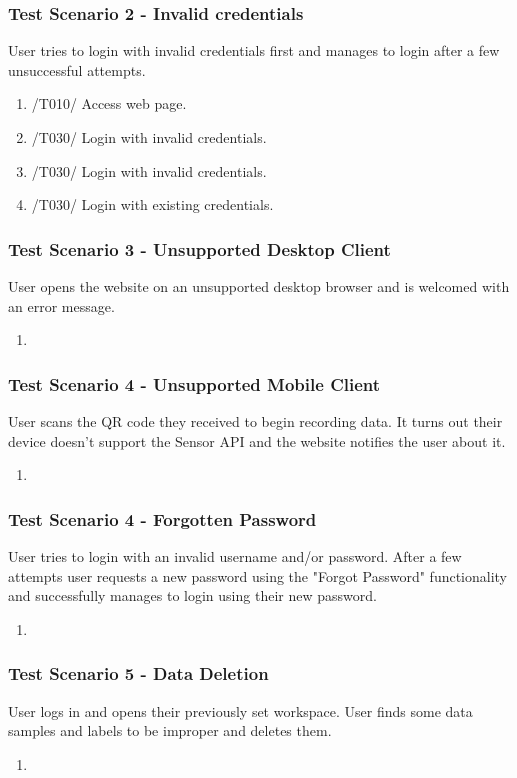 \subsubsection{Test Scenario 2 - Invalid credentials}
User tries to login with invalid credentials first and manages to login after a few unsuccessful attempts.
\begin{enumerate}
    \item /T010/ Access web page.
    \item /T030/ Login with invalid credentials.
    \item /T030/ Login with invalid credentials.
    \item /T030/ Login with existing credentials.
\end{enumerate}
\subsubsection{Test Scenario 3 - Unsupported Desktop Client}
User opens the website on an unsupported desktop browser and is welcomed with an error message.
\begin{enumerate}
    \item 
\end{enumerate} 
\subsubsection{Test Scenario 4 - Unsupported Mobile Client}
User scans the QR code they received to begin recording data. It turns out their device doesn't support the Sensor API and the website notifies the user about it.
\begin{enumerate}
    \item 
\end{enumerate}
\subsubsection{Test Scenario 4 - Forgotten Password}
User tries to login with an invalid username and/or password. After a few attempts user requests a new password using the "Forgot Password" functionality and successfully manages to login using their new password.
\begin{enumerate}
    \item 
\end{enumerate} 
\subsubsection{Test Scenario 5 - Data Deletion} 
User logs in and opens their previously set workspace. User finds some data samples and labels to be improper and deletes them.
\begin{enumerate}
    \item 
\end{enumerate}
